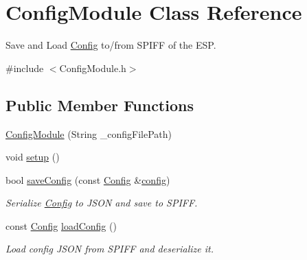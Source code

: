 \hypertarget{class_config_module}{}\section{Config\+Module Class Reference}
\label{class_config_module}


Save and Load \mbox{\hyperlink{struct_config}{Config}} to/from S\+P\+I\+FF of the E\+SP.  




{\ttfamily \#include $<$Config\+Module.\+h$>$}

\subsection*{Public Member Functions}
\begin{DoxyCompactItemize}
\item 
\mbox{\hyperlink{class_config_module_a0f7c95e0a768a56c7f4ff835b09657b2}{Config\+Module}} (String \+\_\+config\+File\+Path)
\item 
void \mbox{\hyperlink{class_config_module_a3ab8220b02e11fdb12af8111ef77c6ac}{setup}} ()
\item 
bool \mbox{\hyperlink{class_config_module_ab7b7cb9aba4ab90bec664eef2b4a00f3}{save\+Config}} (const \mbox{\hyperlink{struct_config}{Config}} \&\mbox{\hyperlink{main_8cpp_a4a8dd3a2de125b72d4fe6251a0a271b5}{config}})
\begin{DoxyCompactList}\small\item\em Serialize \mbox{\hyperlink{struct_config}{Config}} to J\+S\+ON and save to S\+P\+I\+FF. \end{DoxyCompactList}\item 
const \mbox{\hyperlink{struct_config}{Config}} \mbox{\hyperlink{class_config_module_a1a9cda5559839cac0f4444d6352e9067}{load\+Config}} ()
\begin{DoxyCompactList}\small\item\em Load config J\+S\+ON from S\+P\+I\+FF and deserialize it. \end{DoxyCompactList}\end{DoxyCompactItemize}
